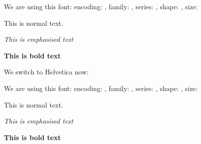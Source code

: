 \documentclass{article}
\makeatletter
\newcommand{\showfont}{encoding: \f@encoding{},
  family: \f@family{},
  series: \f@series{},
  shape: \f@shape{},
  size: \f@size{}
}
\makeatother
\begin{document}
We are using this font: \showfont

This is normal text.

\em{This is emphasised text}

\bf{This is bold text}

We switch to Helvetica now:

\renewcommand{\familydefault}{\sfdefault} \normalfont

We are using this font: \showfont

This is normal text.

\em{This is emphasised text}

\bf{This is bold text}
\end{document}
